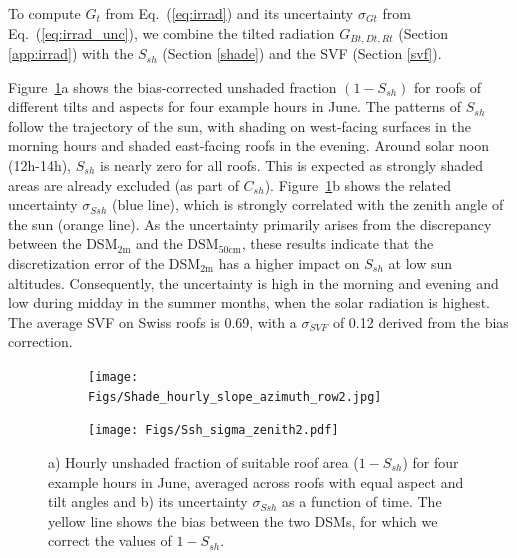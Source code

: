 
To compute $G_t$ from Eq.~(\ref{eq:irrad}) and its uncertainty $\sigma_{Gt}$ from Eq.~(\ref{eq:irrad_unc}), we combine the tilted radiation $G_{Bt,Dt,Rt}$ (Section \ref{app:irrad}) with the $S_{sh}$ (Section \ref{shade}) and the SVF (Section \ref{svf}).

Figure~\ref{fig:Sh}a shows the bias-corrected unshaded fraction $(1-S_{sh})$ for roofs of different tilts and aspects for four example hours in June. 
The patterns of $S_{sh}$ follow the trajectory of the sun, with shading on west-facing surfaces in the morning hours and shaded east-facing roofs in the evening.
Around solar noon (12h-14h), $S_{sh}$ is nearly zero for all roofs. This is expected as strongly shaded areas are already excluded (as part of $C_{sh}$). 
Figure~\ref{fig:Sh}b shows the related uncertainty $\sigma_{\mathit{Ssh}}$ (blue line), which is strongly correlated with the zenith angle of the sun (orange line). As the uncertainty primarily arises from the discrepancy between the DSM$_{2\text{m}}$ and the DSM$_{50\text{cm}}$, these results indicate that the discretization error of the DSM$_{2\text{m}}$ has a higher impact on $S_{sh}$ at low sun altitudes.
Consequently, the uncertainty is high in the morning and evening and low during midday in the summer months, when the solar radiation is highest. 
%
The average SVF on Swiss roofs is 0.69, with a $\sigma_{\mathit{SVF}}$ of 0.12 derived from the bias correction.

\begin{figure}[tb]
\centering
\begin{subfigure}{.98\textwidth}
    \centering
    \texttt{[image: Figs/Shade\_hourly\_slope\_azimuth\_row2.jpg]} \subcaption{}
\end{subfigure}
\begin{subfigure}{.98\textwidth}
    \centering
    \texttt{[image: Figs/Ssh\_sigma\_zenith2.pdf]} 
    \subcaption{}
\end{subfigure}
\caption{a) Hourly unshaded fraction of suitable roof area ($1-S_{sh}$) for four example hours in June, averaged across roofs with equal aspect and tilt angles and b) its uncertainty $\sigma_{\mathit{Ssh}}$ as a function of time. The yellow line shows the bias between the two DSMs, for which we correct the values of $1-S_{sh}$.}
\label{fig:Sh}
\end{figure}

